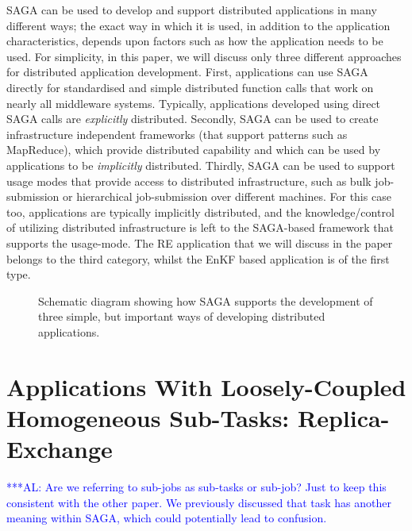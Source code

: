 \documentclass[conference,final]{IEEEtran}
\newcommand{\up}{\vspace*{-1em}}
\newcommand{\alnote}[1]{ {\textcolor{blue} { ***AL: #1 }}}
\newcommand{\alnote}[1]{}
\begin{document}
SAGA can be used to develop and support distributed applications in
many different ways; the exact way in which it is used, in addition to
the application characteristics, depends upon factors such as how the
application needs to be used. For simplicity, in this paper, we will
discuss only three different approaches for distributed application
development.  First, applications can use SAGA directly for
standardised and simple distributed function calls that work on nearly
all middleware systems. Typically, applications developed using direct
SAGA calls are {\it explicitly} distributed.  Secondly, SAGA can be
used to create infrastructure independent frameworks (that support
patterns such as MapReduce), which provide distributed capability and
which can be used by applications to be {\it implicitly}
distributed. Thirdly, SAGA can be used to support usage modes that
provide access to distributed infrastructure, such as bulk
job-submission or hierarchical job-submission over different
machines. For this case too, applications are typically implicitly
distributed, and the knowledge/control of utilizing distributed
infrastructure is left to the SAGA-based framework that supports the
usage-mode. The RE application that we will discuss in the paper
belongs to the third category, whilst the EnKF based application is of
the first type.

\up
\begin{figure}[!h]
  \begin{center}
  \end{center}
  \caption{Schematic diagram showing how SAGA supports the development
    of three simple, but important ways of developing distributed
    applications. \up \up}
  \label{sagalayer}
\end{figure}


\section{Applications With Loosely-Coupled Homogeneous
  Sub-Tasks: Replica-Exchange}  
\up 
\alnote{Are we referring to sub-jobs as sub-tasks or sub-job? Just to
  keep this consistent with the other paper. We previously discussed
  that task has another meaning within SAGA, which could potentially
  lead to confusion.}
  
\end{document}
